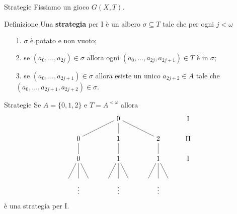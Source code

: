 \documentclass[aspectratio=43]{beamer}
\begin{document}
\begin{frame}{Strategie}
  Fissiamo un gioco \(G(X, T)\).
  \begin{block}{Definizione}
     Una \textbf{strategia} per \(\mathrm{I}\) è un albero \(\sigma \subseteq T\) tale che per ogni \(j < \omega\)
    \begin{itemize}
    \item[1.] \(\sigma\) è potato e non vuoto;
    \item[2.] se \((a_0, \ldots, a_{2j}) \in \sigma\) allora ogni \((a_0, \ldots, a_{2j}, a_{2j+1}) \in T\) è in \(\sigma\);
    \item[3.] se \((a_0, \ldots, a_{2j + 1}) \in \sigma\) allora esiste un unico \(a_{2j + 2} \in A\) tale che \((a_0, \ldots, a_{2j + 1}, a_{2j + 2}) \in \sigma\).
    \end{itemize}
  \end{block}
\end{frame}

\begin{frame}{Strategie}
  Se \(A = \{0, 1, 2\}\) e \(T = A^{<\omega}\) allora
  \begin{equation*}
    \begin{tikzpicture}
      \node (1) at (0, 0){\(0\)};
      \node (11) at (-2, -1){\(0\)};
      \node (12) at (0, -1){\(1\)};
      \node (13) at (2, -1){\(2\)};
      \node (21) at (-2, -2){\(0\)};
      \node (22) at (0, -2){\(1\)};
      \node (23) at (2, -2){\(1\)};
      \node (dots) at (0, -3.5){\(\vdots\)};
      \node (dots) at (-2, -3.5){\(\vdots\)};
      \node (dots) at (2, -3.5){\(\vdots\)};

      \node (a) at (3.5, 0){\(\mathrm{I}\)};
      \node (a) at (3.5, -1){\(\mathrm{II}\)};
      \node (a) at (3.5, -2){\(\mathrm{I}\)};

      \draw[-] (1) -- (11) -- (21);
      \draw[-] (1) -- (12) -- (22);
      \draw[-] (1) -- (13) -- (23);

      \draw[-] (21) -- (-2.5, -3);
      \draw[-] (21) -- (-2, -3);
      \draw[-] (21) -- (-1.5, -3);

      \draw[-] (22) -- (-0.5, -3);
      \draw[-] (22) -- (0, -3);
      \draw[-] (22) -- (0.5, -3);

      \draw[-] (23) -- (1.5, -3);
      \draw[-] (23) -- (2, -3);
      \draw[-] (23) -- (2.5, -3);
    \end{tikzpicture}
  \end{equation*}
  è una strategia per \(\mathrm{I}\).
\end{frame}
\end{document}
